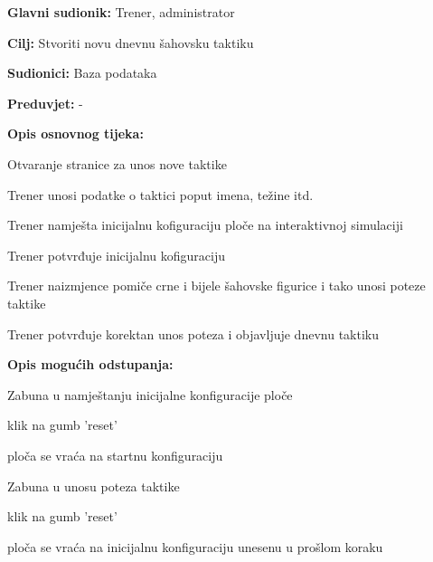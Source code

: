 					\noindent {}
					\begin{packed_item}
	
						\item \textbf{Glavni sudionik: }Trener, administrator
						\item  \textbf{Cilj: } Stvoriti novu dnevnu šahovsku taktiku
						\item  \textbf{Sudionici: } Baza podataka
						\item  \textbf{Preduvjet: } -
						\item  \textbf{Opis osnovnog tijeka:}
						
						\item[] \begin{packed_enum}
	
							\item Otvaranje stranice za unos nove taktike
							\item Trener unosi podatke o taktici poput imena, težine itd.
							\item Trener namješta inicijalnu kofiguraciju ploče na interaktivnoj simulaciji
							\item Trener potvrđuje inicijalnu kofiguraciju
							\item Trener naizmjence pomiče crne i bijele šahovske figurice i tako unosi poteze taktike
							\item Trener potvrđuje korektan unos poteza i objavljuje dnevnu taktiku
							
						\end{packed_enum}
						
						\item  \textbf{Opis mogućih odstupanja:}
						
						\item[] \begin{packed_item}
	
							\item Zabuna u namještanju inicijalne konfiguracije ploče
							\item[] \begin{packed_enum}
								
								\item klik na gumb 'reset'
								\item ploča se vraća na startnu konfiguraciju
								
							\end{packed_enum}
							
							\item Zabuna u unosu poteza taktike
							\item[] \begin{packed_enum}
								
								\item klik na gumb 'reset'
								\item ploča se vraća na inicijalnu konfiguraciju unesenu u prošlom koraku
								
							\end{packed_enum}
							
						\end{packed_item}
					\end{packed_item}
					
